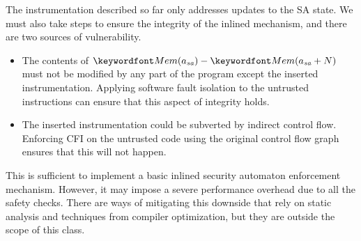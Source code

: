 \documentclass[11pt,twoside]{scrartcl}
\begin{document}
The instrumentation described so far only addresses updates to the SA state. We must also take steps to ensure the integrity of the inlined mechanism, and there are two sources of vulnerability.
\begin{itemize}
\item The contents of $\pderef{a_{\textit{sa}}} - \pderef{a_{\textit{sa}}+N}$ must not be modified by any part of the program except the inserted instrumentation. Applying software fault isolation to the untrusted instructions can ensure that this aspect of integrity holds.
\item The inserted instrumentation could be subverted by indirect control flow. Enforcing CFI on the untrusted code using the original control flow graph ensures that this will not happen.
\end{itemize}
This is sufficient to implement a basic inlined security automaton enforcement mechanism. However, it may impose a severe performance overhead due to all the safety checks. There are ways of mitigating this downside that rely on static analysis and techniques from compiler optimization, but they are outside the scope of this class. 



\end{document}
